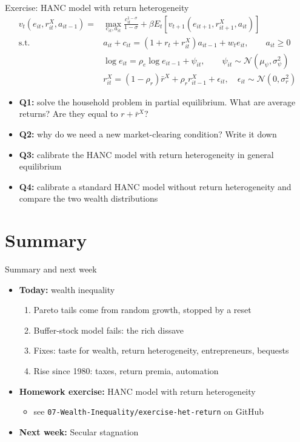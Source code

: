 \documentclass[10pt,english,10pt]{beamer}
\begin{document}
\begin{frame}{Exercise: HANC model with return heterogeneity}
\[
\begin{aligned}v_{t}(e_{it},r_{it}^{X},a_{it-1})= & \max_{c_{it},a_{it}}\frac{c_{it}^{1-\sigma}}{1-\sigma}+\beta E_{t}\left[v_{t+1}(e_{it+1},r_{it+1}^{X},a_{it})\right]\\
\text{s.t.}\quad & a_{it}+c_{it}=(1+r_{t}+r_{it}^{X})a_{it-1}+w_{t}e_{it},\qquad a_{it}\geq0\\
 & \log e_{it}=\rho_{e}\log e_{it-1}+\psi_{it},\qquad\psi_{it}\sim\mathcal{N}(\mu_{\psi},\sigma_{\psi}^{2})\\
 & r_{it}^{X}=(1-\rho_{r})\bar{r}^{X}+\rho_{r}r_{it-1}^{X}+\epsilon_{it},\quad\epsilon_{it}\sim\mathcal{N}(0,\sigma_{r}^{2})
\end{aligned}
\]
\begin{itemize}
\item \textbf{Q1:} solve the household problem in partial equilibrium. What are average returns? Are they equal to $r+\bar{r}^{X}$?
\item \textbf{Q2:} why do we need a new market-clearing condition? Write it down
\item \textbf{Q3:} calibrate the HANC model with return heterogeneity in general equilibrium
\item \textbf{Q4:} calibrate a standard HANC model without return heterogeneity and compare the two wealth distributions
\end{itemize}
\end{frame}

\section{Summary}

\begin{frame}{Summary and next week}
\begin{itemize}
\item \textbf{Today:} wealth inequality
\begin{enumerate}
\item Pareto tails come from random growth, stopped by a reset
\item Buffer-stock model fails: the rich dissave
\item Fixes: taste for wealth, return heterogeneity, entrepreneurs, bequests
\item Rise since 1980: taxes, return premia, automation
\end{enumerate}
\item \textbf{Homework exercise:} HANC model with return heterogeneity
\begin{itemize}
\item see \texttt{07-Wealth-Inequality/exercise-het-return} on GitHub
\end{itemize}
\item \textbf{Next week:} Secular stagnation
\end{itemize}
\end{frame}
\end{document}
